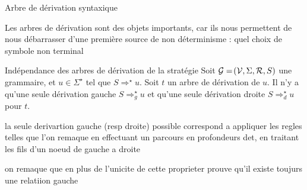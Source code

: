 \documentclass[a4paper,french,bookmarks]{book}
\begin{document}
\begin{example}{Arbre de dérivation syntaxique}{}
\begin{minipage}{0.5\linewidth}
\begin{center}
        \end{center}
        \end{minipage}
    \end{example}
    
    Les arbres de dérivation sont des objets importants, car ils nous permettent de nous débarrasser d'une première source de non déterminisme : quel choix de symbole non terminal 
    
    \begin{property}{Indépendance des arbres de dérivation de la stratégie}{}
        Soit $\mathcal{G} = \!\left(\mathcal{V}, \Sigma, \mathcal{R}, S\right)$ une grammaire, et $u \in \Sigma^\star$ tel que $S \Rightarrow^\star u$. Soit $t$ un arbre de dérivation de $u$. Il n'y a  qu'une seule dérivation gauche $S \Rightarrow^\star_g u$ et qu'une seule dérivation droite $S \Rightarrow^\star_d u$ pour $t$.
    \end{property}
    
    \begin{nproof}
    
    la seule derivartion gauche (resp droite) possible correspond a appliquer les regles telles que l'on remaque en effectuant un parcours en profondeurs det, en traitant les fils d'un noeud de gauche a droite 
    
    
    \end{nproof}
    on remaque que en plus de l'unicite de cette proprieter prouve qu'il existe toujurs une relatiion gauche 
    
\end{document}
